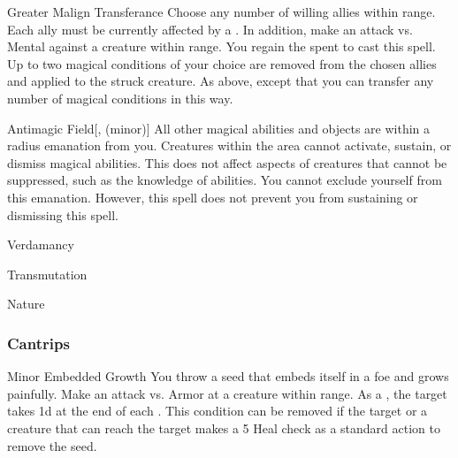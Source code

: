 \lowercase{\hypertarget{spell:Greater Malign Transferance}{}}\label{spell:Greater Malign Transferance}
\begin{apability}[\nth{5}]{\hypertarget{spell:Greater Malign Transferance}{Greater Malign Transferance}}
Choose any number of willing allies within \rngmed range.
Each ally must be currently affected by a  .
In addition, make an attack vs. Mental against a creature within \rngmed range.
\miss You regain the  spent to cast this spell.
\hit Up to two magical conditions of your choice are removed from the chosen allies and applied to the struck creature.
\crit As above, except that you can transfer any number of magical conditions in this way.
\end{apability}
\vspace{0.25em}



\lowercase{\hypertarget{spell:Antimagic Field}{}}\label{spell:Antimagic Field}
\begin{apability}[\nth{7}]{\hypertarget{spell:Antimagic Field}{Antimagic Field}}[,  (minor)]
All other magical abilities and objects are  within a \areamed radius emanation from you.
Creatures within the area cannot activate, sustain, or dismiss magical abilities.
This does not affect aspects of creatures that cannot be suppressed, such as the knowledge of abilities.
You cannot exclude yourself from this emanation.
However, this spell does not prevent you from sustaining or dismissing this spell.
\end{apability}
\vspace{0.25em}


\newpage
\begin{spellsection}{Verdamancy}

\begin{spellheader}
\end{spellheader}


 Transmutation

 Nature

\subsubsection{Cantrips}


\begin{freeability}{Minor Embedded Growth}
You throw a seed that embeds itself in a foe and grows painfully.
Make an attack vs. Armor at a creature within \rngclose range.
\hit As a , the target takes  \minus1d at the end of each .
This condition can be removed if the target or a creature that can reach the target makes a  5 Heal check as a standard action to remove the seed.
\end{freeability}

\end{spellsection}


